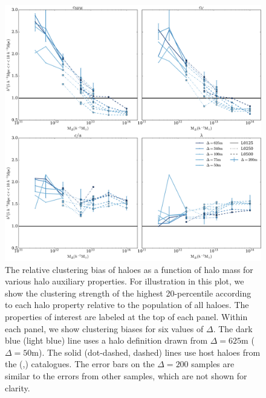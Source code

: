 \documentclass[usenatbib,fleqn]{mnras}
\begin{document}
\begin{figure}
	\centering
	\includegraphics[width=\textwidth]{biasplot.pdf}
	\caption{
The relative clustering bias of haloes as a function of halo mass for various halo auxiliary properties. For illustration in this plot, we show the clustering strength of the highest 20-percentile according to each halo property relative to the population of all haloes. The properties of interest are labeled at the top of each panel. Within each panel, we show clustering biases for six values of $\Delta$. The dark blue (light blue) line uses a halo definition drawn from $\Delta = 625$m ($\Delta = 50$m). The solid (dot-dashed, dashed) lines use host haloes from the \simA{} (\simB,\simC) catalogues. The error bars on the $\Delta=200$ samples are similar to the errors from other samples, which are not shown for clarity.
}
\label{fig:biascompare}
\end{figure}
\end{document}
